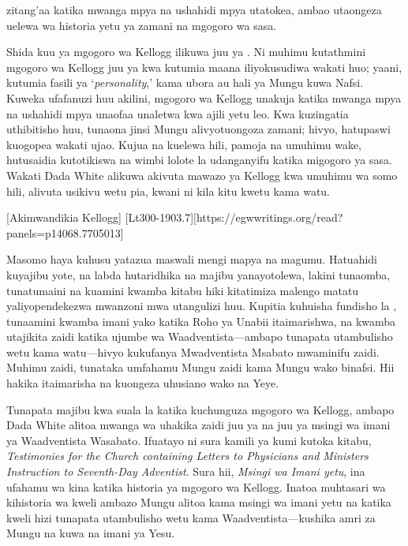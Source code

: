 zitang'aa katika mwanga mpya na ushahidi mpya utatokea, ambao utaongeza uelewa wa historia yetu ya zamani na mgogoro wa sasa.

Shida kuu ya mgogoro wa Kellogg ilikuwa juu ya . Ni muhimu kutathmini mgogoro wa Kellogg juu ya  kwa kutumia maana iliyokusudiwa wakati huo; yaani, kutumia fasili ya ‘\textit{personality},’ kama ubora au hali ya Mungu kuwa Nafsi. Kuweka ufafanuzi huu akilini, mgogoro wa Kellogg unakuja katika mwanga mpya na ushahidi mpya unaofaa unaletwa kwa ajili yetu leo. Kwa kuzingatia uthibitisho huu, tunaona jinsi Mungu alivyotuongoza zamani; hivyo, hatupaswi kuogopea wakati ujao. Kujua na kuelewa hili, pamoja na umuhimu wake, hutusaidia kutotikiswa na wimbi lolote la udanganyifu katika migogoro ya sasa. Wakati Dada White alikuwa akivuta mawazo ya Kellogg kwa umuhimu wa somo hili, alivuta usikivu wetu pia, kwani ni kila kitu kwetu kama watu.

[Akimwandikia Kellogg] [Lt300-1903.7][https://egwwritings.org/read?panels=p14068.7705013]

Masomo haya kuhusu  yatazua maswali mengi mapya na magumu. Hatuahidi kuyajibu yote, na labda hutaridhika na majibu yanayotolewa, lakini tunaomba, tunatumaini na kuamini kwamba kitabu hiki kitatimiza malengo matatu yaliyopendekezwa mwanzoni mwa utangulizi huu. Kupitia kuhuisha fundisho la , tunaamini kwamba imani yako katika Roho ya Unabii itaimarishwa, na kwamba utajikita zaidi katika ujumbe wa Waadventista—ambapo tunapata utambulisho wetu kama watu—hivyo kukufanya Mwadventista Msabato mwaminifu zaidi. Muhimu zaidi, tunataka umfahamu Mungu zaidi kama Mungu wako binafsi. Hii hakika itaimarisha na kuongeza uhusiano wako na Yeye.

Tunapata majibu kwa suala la  katika kuchunguza mgogoro wa Kellogg, ambapo Dada White alitoa mwanga wa uhakika zaidi juu ya  na juu ya msingi wa imani ya Waadventista Wasabato. Ifuatayo ni sura kamili ya kumi kutoka kitabu, \textit{Testimonies for the Church containing Letters to Physicians and Ministers Instruction to Seventh-Day Adventist}. Sura hii, \textit{Msingi wa Imani yetu}, ina ufahamu wa kina katika historia ya mgogoro wa Kellogg. Inatoa muhtasari wa kihistoria wa kweli ambazo Mungu alitoa kama msingi wa imani yetu na katika kweli hizi tunapata utambulisho wetu kama Waadventista—kushika amri za Mungu na kuwa na imani ya Yesu.
